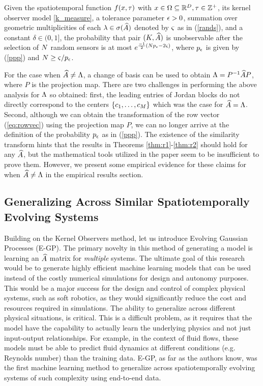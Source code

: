 \begin{theorem}\label{thm:r2}
	Given the spatiotemporal function $ f(x,\tau) $ with $ x \in \Omega \subseteq  \mathbb{R}^{D}, \tau\in \mathbb{Z}^+  $, its kernel observer model \eqref{k_measure}, a tolerance parameter $\epsilon>0$, summation over geometric multiplicities of each $ \lambda \in \sigma(\widehat{A}) $ denoted by $ \varsigma  $ as in  (\ref{rands}), and a constant $ \delta \in (0,1] $, the probability that pair $ (K, \widehat{A}) $ is unobservable after the selection of $ N $ random sensors is at most $ e^{\frac{-1}{2}(N p_{\epsilon}-2\varsigma)} $, where $ p_{\epsilon} $ is given by (\ref{ppp}) and $ N \geq \varsigma/p_{\epsilon} $.
\end{theorem}
For the case when $ \widehat{A} \neq \Lambda $, a change of basis can be used to obtain $ \Lambda = P^{-1}\widehat{A} P $, where $ P $ is the projection map. There are two challenges in performing the above analysis for $\Lambda$ so obtained: first, the leading entries of Jordan blocks do not directly correspond to the centers $\{ c_1,\dots,c_M\}$ which was the case for $ \widehat{A} = \Lambda $. Second, although we can obtain the transformation of the row vector (\ref{eq:rowvec}) using the projection map $P$, we can no longer arrive at the definition of the probability $p_{\epsilon}$ as in  (\ref{ppp}). The existence of the similarity transform hints that the results in Theorems \ref{thm:r1}-\ref{thm:r2} should hold for any $ \widehat{A}$, but the mathematical tools utilized in the paper seem to be insufficient to prove them. However, we present some empirical evidence for these claims for when $ \widehat{A} \neq \Lambda $  in the empirical results section.%


\subsection{Generalizing Across Similar Spatiotemporally Evolving Systems} \label{sec:egp}
Building on the Kernel Observers method, let us introduce Evolving Gaussian Processes (E-GP). The primary novelty in this method of generating a model is learning an $\widehat{A}$ matrix for \emph{multiple} systems. The ultimate goal of this research would be to generate highly efficient machine learning models that can be used instead of the costly numerical simulations for design and autonomy purposes. This would be a major success for the design and control of complex physical systems, such as soft robotics, as they would significantly reduce the cost and resources required in simulations. The ability to generalize across different physical situations, is critical. This is a difficult problem, as it requires that the model have the capability to actually learn the underlying physics and not just input-output relationships. For example, in the context of fluid flows, these models must be able to predict fluid dynamics at different conditions (e.g. Reynolds number) than the training data. E-GP, as far as the authors know, was the first machine learning method to generalize across spatiotemporally evolving systems of such complexity using end-to-end data.

